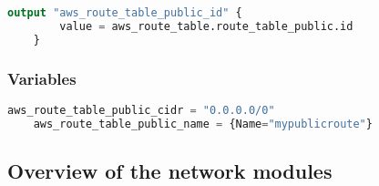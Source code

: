 \begin{lstlisting}[language=terraform]
    output "aws_route_table_public_id" {
        value = aws_route_table.route_table_public.id
    }
\end{lstlisting}

\subsubsection{
{Variables}}

\begin{lstlisting}[language=terraform]
    aws_route_table_public_cidr = "0.0.0.0/0"
    aws_route_table_public_name = {Name="mypublicroute"}
\end{lstlisting}

\subsection{
{Overview of the network modules}}
\label{sec:Overzicht van de netwerk modules}

